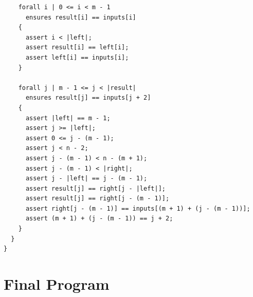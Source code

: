 \documentclass{article}
\begin{document}
\begin{lstlisting}
    forall i | 0 <= i < m - 1
      ensures result[i] == inputs[i]
    {
      assert i < |left|;
      assert result[i] == left[i];
      assert left[i] == inputs[i];
    }

    forall j | m - 1 <= j < |result|
      ensures result[j] == inputs[j + 2]
    {
      assert |left| == m - 1;
      assert j >= |left|;
      assert 0 <= j - (m - 1);
      assert j < n - 2;
      assert j - (m - 1) < n - (m + 1);
      assert j - (m - 1) < |right|;
      assert j - |left| == j - (m - 1);
      assert result[j] == right[j - |left|];
      assert result[j] == right[j - (m - 1)];
      assert right[j - (m - 1)] == inputs[(m + 1) + (j - (m - 1))];
      assert (m + 1) + (j - (m - 1)) == j + 2;
    }
  }
}
\end{lstlisting}
\section*{Final Program}
\end{document}
